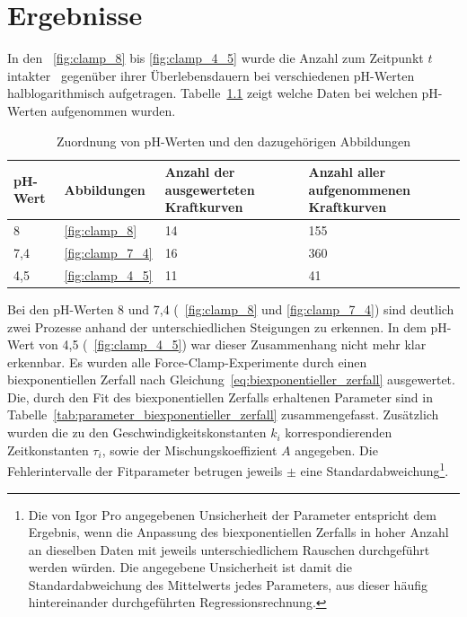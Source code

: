 \chapter{Ergebnisse}
\label{kap:ergebnisse}

In den \abbn~\ref{fig:clamp_8} bis \ref{fig:clamp_4_5} wurde die Anzahl zum Zeitpunkt $t$ intakter \amide~gegenüber ihrer Überlebensdauern bei verschiedenen pH-Werten halblogarithmisch aufgetragen. Tabelle~\ref{tab:zuordnung_ph_abbildungen} zeigt welche Daten bei welchen pH-Werten aufgenommen wurden.

\begin{table}[h]
	\centering
	\caption[Zuordnung von pH-Werten und den dazugehörigen Abbildungen]{Zuordnung von pH-Werten und den dazugehörigen Abbildungen}
	\label{tab:zuordnung_ph_abbildungen}
	\begin{threeparttable}
		\keepXColumns
		\begin{tabularx}{\textwidth}{X X X X}
			\textbf{pH-Wert}	&	\textbf{Abbildungen}	&	\textbf{Anzahl der ausgewerteten Kraftkurven}	&	\textbf{Anzahl aller aufgenommenen Kraftkurven}\\
			\toprule
			\toprule
			8	&	\ref{fig:clamp_8}	&	14	&	155\\
			7,4	&	\ref{fig:clamp_7_4}	&	16	&	360\\
			4,5	&	\ref{fig:clamp_4_5}	&	11	&	41\\
			\toprule
			\toprule
		\end{tabularx}
	\end{threeparttable}
\end{table}

Bei den pH-Werten 8 und 7,4 (\abbn~\ref{fig:clamp_8} und \ref{fig:clamp_7_4}) sind deutlich zwei Prozesse anhand der unterschiedlichen Steigungen zu erkennen. In dem pH-Wert von 4,5 (\abb~\ref{fig:clamp_4_5}) war dieser Zusammenhang nicht mehr klar erkennbar. Es wurden alle Force-Clamp-Experimente durch einen biexponentiellen Zerfall nach Gleichung~\ref{eq:biexponentieller_zerfall} ausgewertet.\\
Die, durch den Fit des biexponentiellen Zerfalls erhaltenen Parameter sind in Tabelle~\ref{tab:parameter_biexponentieller_zerfall} zusammengefasst. Zusätzlich wurden die zu den Geschwindigkeitskonstanten $k_i$ korrespondierenden Zeitkonstanten $\tau_i$, sowie der Mischungskoeffizient $A$ angegeben. Die Fehlerintervalle der Fitparameter betrugen jeweils $\pm$ eine Standardabweichung\footnote{Die von Igor Pro angegebenen Unsicherheit der Parameter entspricht dem Ergebnis, wenn die Anpassung des biexponentiellen Zerfalls in hoher Anzahl an dieselben Daten mit jeweils unterschiedlichem Rauschen durchgeführt werden würden. Die angegebene Unsicherheit ist damit die Standardabweichung des Mittelwerts jedes Parameters, aus dieser häufig hintereinander durchgeführten Regressionsrechnung.}.

